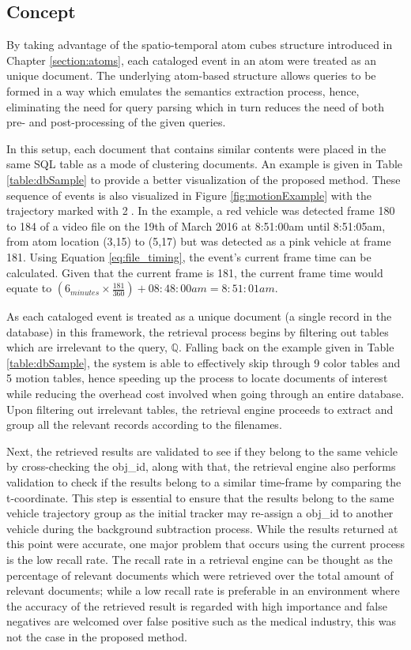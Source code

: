 \subsection{Concept}
By taking advantage of the spatio-temporal atom cubes structure introduced in Chapter \ref{section:atoms}, each cataloged event in an atom were treated as an unique document. The underlying atom-based structure allows queries to be formed in a way which emulates the semantics extraction process, hence, eliminating the need for query parsing which in turn reduces the need of both pre- and post-processing of the given queries. 

In this setup, each document that contains similar contents were placed in the same SQL table as a mode of clustering documents. An example is given in Table \ref{table:dbSample} to provide a better visualization of the proposed method. These sequence of events is also visualized in Figure \ref{fig:motionExample} with the trajectory marked with \textcircled{2}. In the example, a red vehicle was detected frame 180 to 184 of a video file on the 19th of March 2016 at 8:51:00am until 8:51:05am, from atom location (3,15) to (5,17) but was detected as a pink vehicle at frame 181. Using Equation \ref{eq:file_timing}, the event's current frame time can be calculated. Given that the current frame is 181, the current frame time would equate to  $(6_{minutes} \times \frac{181}{360}) + 08:48:00am = 8:51:01am$.

As each cataloged event is treated as a unique document (a single record in the database) in this framework, the retrieval process begins by filtering out tables which are irrelevant to the query, $\mathbb{Q}$. Falling back on the example given in Table \ref{table:dbSample}, the system is able to effectively skip through 9 color tables and 5 motion tables, hence speeding up the process to locate documents of interest while reducing the overhead cost involved when going through an entire database. Upon filtering out irrelevant tables, the retrieval engine proceeds to extract and group all the relevant records according to the filenames.

Next, the retrieved results are validated to see if they belong to the same vehicle by cross-checking the obj\_id, along with that, the retrieval engine also performs validation to check if the results belong to a similar time-frame by comparing the t-coordinate. This step is essential to ensure that the results belong to the same vehicle trajectory group as the initial tracker may re-assign a obj\_id to another vehicle during the background subtraction process. While the results returned at this point were accurate, one major problem that occurs using the current process is the low recall rate. The recall rate in a retrieval engine can be thought as the percentage of relevant documents which were retrieved over the total amount of relevant documents; while a low recall rate is preferable in an environment where the accuracy of the retrieved result is regarded with high importance and false negatives are welcomed over false positive such as the medical industry, this was not the case in the proposed method.

